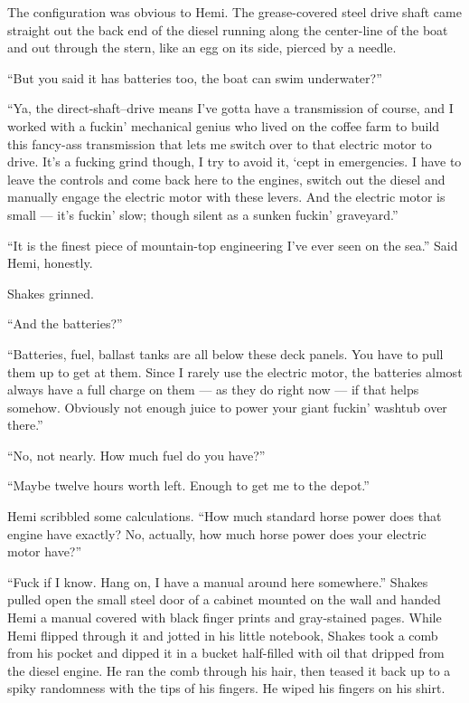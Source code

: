 \documentclass[]{scrbook}
\begin{document}
The configuration was obvious to Hemi. The grease-covered steel drive
shaft came straight out the back end of the diesel running along the
center-line of the boat and out through the stern, like an egg on its
side, pierced by a needle.

``But you said it has batteries too, the boat can swim underwater?''

``Ya, the direct-shaft--drive means I've gotta have a transmission of
course, and I worked with a fuckin' mechanical genius who lived on the
coffee farm to build this fancy-ass transmission that lets me switch
over to that electric motor to drive. It's a fucking grind though, I try
to avoid it, `cept in emergencies. I have to leave the controls and come
back here to the engines, switch out the diesel and manually engage the
electric motor with these levers. And the electric motor is small ---
it's fuckin' slow; though silent as a sunken fuckin' graveyard.''

``It is the finest piece of mountain-top engineering I've ever seen on
the sea.'' Said Hemi, honestly.

Shakes grinned.

``And the batteries?''

``Batteries, fuel, ballast tanks are all below these deck panels. You
have to pull them up to get at them. Since I rarely use the electric
motor, the batteries almost always have a full charge on them --- as
they do right now --- if that helps somehow. Obviously not enough juice
to power your giant fuckin' washtub over there.''

``No, not nearly. How much fuel do you have?''

``Maybe twelve hours worth left. Enough to get me to the depot.''

Hemi scribbled some calculations. ``How much standard horse power does
that engine have exactly? No, actually, how much horse power does your
electric motor have?''

``Fuck if I know. Hang on, I have a manual around here somewhere.''
Shakes pulled open the small steel door of a cabinet mounted on the wall
and handed Hemi a manual covered with black finger prints and
gray-stained pages. While Hemi flipped through it and jotted in his
little notebook, Shakes took a comb from his pocket and dipped it in a
bucket half-filled with oil that dripped from the diesel engine. He ran
the comb through his hair, then teased it back up to a spiky randomness
with the tips of his fingers. He wiped his fingers on his shirt.
\end{document}
